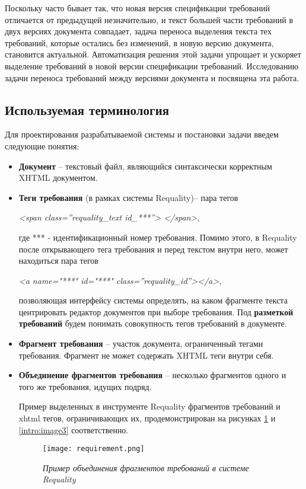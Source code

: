 Поскольку часто бывает так, что новая версия спецификации требований отличается от предыдущей незначительно, и текст большей части требований в двух версиях документа совпадает, задача переноса выделения текста тех требований, которые остались без изменений, в новую версию документа, становится актуальной. Автоматизация решения этой задачи упрощает и ускоряет выделение требований в новой версии спецификации требований. Исследованию задачи переноса требований между версиями документа и посвящена эта работа.

\subsection{Используемая терминология}
Для проектирования разрабатываемой системы и постановки задачи введем следующие понятия:
\begin{itemize}
\item \textbf{Документ} – текстовый файл, являющийся синтаксически корректным XHTML документом.
\item \textbf{Теги требования} (в рамках системы Requality)– пара тегов

\emph{<span class=”requality\_text id\_***”> 	</span>},

где *** - идентификационный номер требования. Помимо этого, в Requality после открывающего тега требования и перед текстом внутри него, может находиться пара тегов 

\emph{<a name="***" id="***" class=”requality\_id”></a>},

позволяющая интерфейсу системы определять, на каком фрагменте текста центрировать редактор документов при выборе требования. Под \textbf{разметкой требований} будем понимать совокупность тегов требований в документе.

\item \textbf{Фрагмент требования} – участок документа, ограниченный тегами требования. Фрагмент не может содержать XHTML теги внутри себя.

\item \textbf{Объединение фрагментов требования} – несколько фрагментов одного и того же требования, идущих подряд.

Пример выделенных в инструменте Requality фрагментов требований и xhtml тегов, ограничивающих их, продемонстрирован на рисунках \ref{intro:image2} и \ref{intro:image3} соответственно.

\begin{figure}[h]
\begin{center}
\texttt{[image: requirement.png]}
\caption{\emph{Пример объединения фрагментов требований в системе Requality}}
\label{intro:image2}
\end{center}
\end{figure}


\end{itemize}
